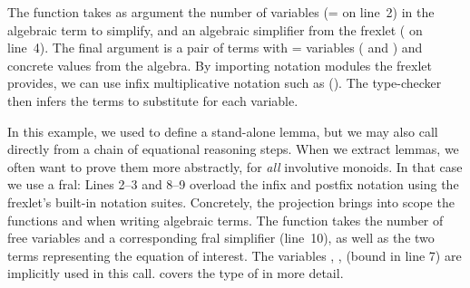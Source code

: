 The  function takes as argument the number of
variables (= on line~2) in the algebraic
term to simplify, and an algebraic simplifier from the frexlet
( on line~4). The final argument
is a pair of terms with = variables
(  and 
) and concrete values from the algebra. By importing
notation modules the frexlet provides, we can use infix multiplicative
notation such as (). The type-checker then infers
the terms to substitute for each variable.

In this example, we used  to define a stand-alone
lemma, but we may also call  directly from a
chain of equational reasoning steps. When we extract lemmas, we often
want to prove them more abstractly, for \emph{all} involutive
monoids. In that case we use a fral:
\InvMonoidFralExample[numbers=right,numbersep=-.125cm] Lines 2--3 and 8--9 overload the
infix and postfix notation using the frexlet's built-in notation
suites. Concretely, the projection  brings
into scope the functions
\IdrisKeyword{(}\IdrisKeyword{)} and
\IdrisKeyword{(}\IdrisKeyword{)} when writing
algebraic terms.  The  function takes the number
of free variables and a corresponding fral simplifier (line~10), as
well as the two terms representing the equation of interest.  The
variables , ,  (bound in line 7) are
implicitly used in this call. 
covers the type of  in more detail.

